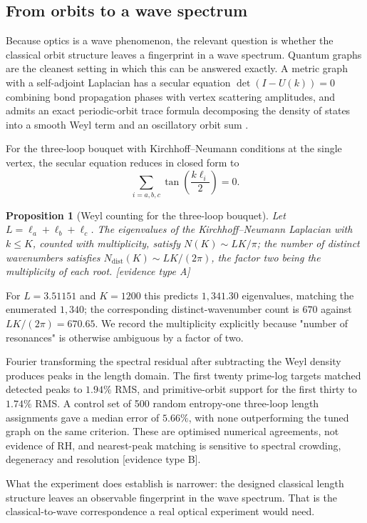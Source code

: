 \documentclass[11pt]{article}
\newtheorem{proposition}[theorem]{Proposition}
\begin{document}
\subsection{From orbits to a wave spectrum}

Because optics is a wave phenomenon, the relevant question is whether the classical
orbit structure leaves a fingerprint in a wave spectrum. Quantum graphs are the cleanest
setting in which this can be answered exactly. A metric graph with a self-adjoint
Laplacian has a secular equation $\det(I-U(k))=0$ combining bond propagation phases with
vertex scattering amplitudes, and admits an exact periodic-orbit trace formula
decomposing the density of states into a smooth Weyl term and an oscillatory
orbit sum \cite{kottos1999,ruelle2002}.

For the three-loop bouquet with Kirchhoff--Neumann conditions at the single vertex, the
secular equation reduces in closed form to
\begin{equation}
\sum_{i=a,b,c}\tan\!\left(\frac{k\ell_i}{2}\right) = 0 .
\end{equation}
\begin{proposition}[Weyl counting for the three-loop bouquet]\label{prop:weyl}
Let $L = \ell_a+\ell_b+\ell_c$. The eigenvalues of the Kirchhoff--Neumann Laplacian with
$k\le K$, counted with multiplicity, satisfy $N(K)\sim LK/\pi$; the number of distinct
wavenumbers satisfies $N_{\mathrm{dist}}(K)\sim LK/(2\pi)$, the factor two being the
multiplicity of each root. [evidence type A]
\end{proposition}
For $L=3.51151$ and $K=1200$ this predicts $1{,}341.30$ eigenvalues, matching the
enumerated $1{,}340$; the corresponding distinct-wavenumber count is $670$ against
$LK/(2\pi)=670.65$. We record the multiplicity explicitly because "number of
resonances" is otherwise ambiguous by a factor of two.

Fourier transforming the spectral residual after subtracting the Weyl density produces
peaks in the length domain. The first twenty prime-log targets matched detected peaks to
$1.94\%$ RMS, and primitive-orbit support for the first thirty to $1.74\%$ RMS. A
control set of 500 random entropy-one three-loop length assignments gave a median error
of $5.66\%$, with none outperforming the tuned graph on the same criterion. These are
optimised numerical agreements, not evidence of RH, and nearest-peak matching is
sensitive to spectral crowding, degeneracy and resolution [evidence type B].

What the experiment does establish is narrower: the designed classical length structure
leaves an observable fingerprint in the wave spectrum. That is the classical-to-wave
correspondence a real optical experiment would need.
\end{document}
